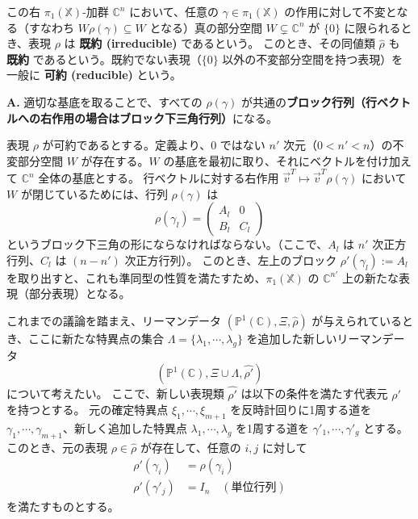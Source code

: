 \begin{definition}[表現の既約性]
    この右 $\pi_{1}(\mathbb{X})$-加群 $\mathbb{C}^{n}$ において、任意の $\gamma \in \pi_{1}(\mathbb{X})$ の作用に対して不変となる（すなわち $W \rho(\gamma) \subseteq W$ となる）真の部分空間 $W \subsetneq \mathbb{C}^{n}$ が $\{0\}$ に限られるとき、表現 $\rho$ は \textbf{既約 (irreducible)} であるという。
    このとき、その同値類 $\hat{\rho}$ も \textbf{既約} であるという。既約でない表現（$\{0\}$ 以外の不変部分空間を持つ表現）を一般に \textbf{可約 (reducible)} という。
\end{definition}

\begin{Q}
\textbf{A.} 適切な基底を取ることで、すべての $\rho(\gamma)$ が共通の\textbf{ブロック行列（行ベクトルへの右作用の場合はブロック下三角行列）}になる。

表現 $\rho$ が可約であるとする。定義より、$0$ ではない $n'$ 次元（$0 < n' < n$）の不変部分空間 $W$ が存在する。$W$ の基底を最初に取り、それにベクトルを付け加えて $\mathbb{C}^{n}$ 全体の基底とする。
行ベクトルに対する右作用 $\vec{v}^T \mapsto \vec{v}^T \rho(\gamma)$ において $W$ が閉じているためには、行列 $\rho(\gamma)$ は
\[
\rho(\gamma_{l})=
\begin{pmatrix}
A_{l} & 0\\
B_{l} & C_{l}
\end{pmatrix}
\]
というブロック下三角の形にならなければならない。（ここで、$A_{l}$ は $n'$ 次正方行列、$C_{l}$ は $(n-n')$ 次正方行列）。
このとき、左上のブロック $\rho'(\gamma_{l}):=A_{l}$ を取り出すと、これも準同型の性質を満たすため、$\pi_{1}(\mathbb{X})$ の $\mathbb{C}^{n'}$ 上の新たな表現（部分表現）となる。
\end{Q}

これまでの議論を踏まえ、リーマンデータ $(\mathbb{P}^{1}(\mathbb{C}),\Xi,\hat{\rho})$ が与えられているとき、ここに新たな特異点の集合 $\Lambda=\{\lambda_{1},\cdots,\lambda_{g}\}$ を追加した新しいリーマンデータ
\[
(\mathbb{P}^{1}(\mathbb{C}),\Xi\cup\Lambda,\hat{\rho'})
\]
について考えたい。
ここで、新しい表現類 $\hat{\rho'}$ は以下の条件を満たす代表元 $\rho'$ を持つとする。
元の確定特異点 $\xi_{1},\cdots,\xi_{m+1}$ を反時計回りに1周する道を $\gamma_{1},\cdots,\gamma_{m+1}$、新しく追加した特異点 $\lambda_{1},\cdots,\lambda_{g}$ を1周する道を $\gamma'_{1},\cdots,\gamma'_{g}$ とする。このとき、元の表現 $\rho \in \hat{\rho}$ が存在して、任意の $i, j$ に対して
\begin{align*}
\rho'(\gamma_{i}) &= \rho(\gamma_{i}) \\
\rho'(\gamma'_{j}) &= I_{n} \quad (\text{単位行列})
\end{align*}
を満たすものとする。

